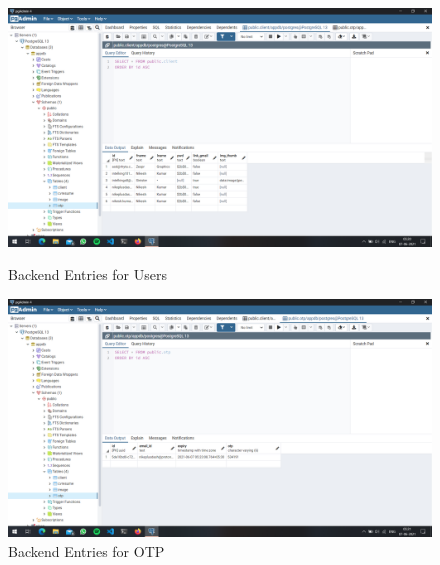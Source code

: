 \documentclass[12pt]{article}
\begin{document}
\begin{figure}[H]
    \begin{minipage}{0.47\textwidth}
        \centering
        \includegraphics[width=\linewidth]{Screenshot (131).png}
        \caption{Backend Entries for Users}
    \end{minipage}\hfill
    \begin{minipage}{0.47\textwidth}
        \centering
        \includegraphics[width=\linewidth]{Screenshot (132).png}
        \caption{Backend Entries for OTP}
    \end{minipage}
\end{figure}
\end{document}
